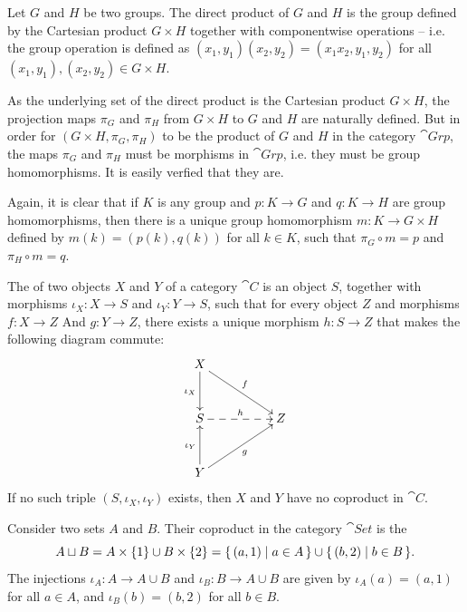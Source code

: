 \begin{Example}
Let $G$ and $H$ be two groups. The direct product of $G$ and $H$ is the group defined by the Cartesian product $G \times H$ together with componentwise operations -- i.e. the group operation is defined as $(x_1, y_1)(x_2, y_2) = (x_1 x_2, y_1, y_2)$ for all $(x_1, y_1), (x_2, y_2) \in G \times H$.

As the underlying set of the direct product is the Cartesian product $G \times H$, the projection maps $\pi_G$ and $\pi_H$ from $G \times H$ to $G$ and $H$ are naturally defined. But in order for $(G \times H, \pi_G, \pi_H)$ to be the product of $G$ and $H$ in the category $\cat{Grp}$, the maps $\pi_G$ and $\pi_H$ must be morphisms in $\cat{Grp}$, i.e. they must be group homomorphisms. It is easily verfied that they are.

Again, it is clear that if $K$ is any group and $p \colon K \to G$ and $q \colon K \to H$ are group homomorphisms, then there is a unique group homomorphism $m \colon K \to G \times H$ defined by $m(k) = (p(k), q(k))$ for all $k \in K$, such that $\pi_G \circ m = p$ and $\pi_H \circ m = q$.
\end{Example}

The  of two objects $X$ and $Y$ of a category $\cat C$ is an object $S$, together with morphisms $\iota_X \colon X \to S$ and $\iota_Y \colon Y \to S$, such that for every object $Z$ and morphisms $f \colon X \to Z$ And $g \colon Y \to Z$, there exists a unique morphism $h \colon S \to Z$ that makes the following diagram commute:
\begin{equation*}
\xymatrix@=3em@C=5em{
X \ar[d]_{\iota_X} \ar[rd]^{f} \\
S \ar@{-->}[r]^h & Z\\
Y \ar[u]^{\iota_Y} \ar[ru]_{g}
}
\end{equation*}
If no such triple $(S, \iota_X, \iota_Y)$ exists, then $X$ and $Y$ have no coproduct in $\cat C$.

\begin{Example}\label{ex:DisjointUnion}
Consider two sets $A$ and $B$. Their coproduct in the category $\cat{Set}$ is the 
\begin{equation*}
A \sqcup B = A \times \{1\} \cup B \times \{2\} = \qty{\, (a, 1) \mid a \in A \,} \cup \qty{\, (b, 2) \mid b \in B \,}.
\end{equation*}
The injections $\iota_A \colon A \to A \cup B$ and $\iota_B \colon B \to A \cup B$ are given by $\iota_A(a) = (a, 1)$ for all $a \in A$, and $\iota_B(b) = (b, 2)$ for all $b \in B$.
\end{Example}

